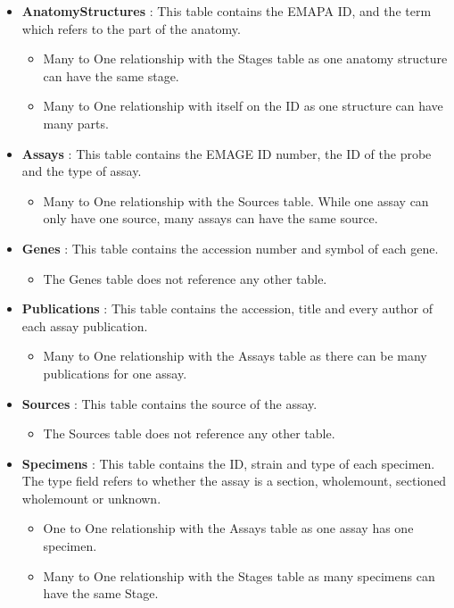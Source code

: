 \begin{itemize}
\item \textbf{AnatomyStructures} : This table contains the EMAPA ID, and the term which refers to the part of the anatomy.
\begin{itemize}
\item Many to One relationship with the Stages table as one anatomy structure can have the same stage.
\item Many to One relationship with itself on the ID as one structure can have many parts.
\end{itemize} 

\item \textbf{Assays} : This table contains the EMAGE ID number, the ID of the probe and the type of assay.
\begin{itemize}
\item Many to One relationship with the Sources table. While one assay can only have one source, many assays can have the same source.
\end{itemize} 

\item \textbf{Genes} : This table contains the accession number and symbol of each gene.
\begin{itemize}
\item The Genes table does not reference any other table.
\end{itemize} 

\item \textbf{Publications} : This table contains the accession, title and every author of each assay publication.
\begin{itemize}
\item Many to One relationship with the Assays table as there can be many publications for one assay.
\end{itemize} 

\item \textbf{Sources} : This table contains the source of the assay.
\begin{itemize}
\item The Sources table does not reference any other table.
\end{itemize} 

\item \textbf{Specimens} :  This table contains the ID, strain and type of each specimen. The type field refers to whether the assay is a section, wholemount, sectioned wholemount or unknown.
\begin{itemize}
\item One to One relationship with the Assays table as one assay has one specimen.
\item Many to One relationship with the Stages table as many specimens can have the same Stage.
\end{itemize} 


\end{itemize}
